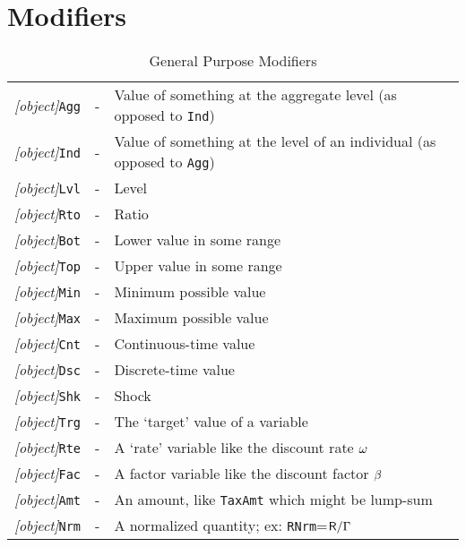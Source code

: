 \documentclass[12pt]{econtex}
\begin{document}
\section{Modifiers}
\begin{table}[ht]
	\centering
	\begin{tabular}{|>{\ttfamily}ccl|} 		
		\hline
   \textit{[object]}\texttt{Agg} & - & Value of something at the aggregate level (as opposed to \texttt{Ind})
\\ \textit{[object]}\texttt{Ind} & - & Value of something at the level of an individual (as opposed to \texttt{Agg})
\\ \textit{[object]}\texttt{Lvl} & - & Level 
\\ \textit{[object]}\texttt{Rto} & - & Ratio 
\\ \textit{[object]}\texttt{Bot} & - & Lower value in some range 
\\ \textit{[object]}\texttt{Top} & - & Upper value in some range 
\\ \textit{[object]}\texttt{Min} & - & Minimum possible value 
\\ \textit{[object]}\texttt{Max} & - & Maximum possible value 
\\ \textit{[object]}\texttt{Cnt} & - & Continuous-time value
\\ \textit{[object]}\texttt{Dsc} & - & Discrete-time value
\\ \textit{[object]}\texttt{Shk} & - & Shock 
\\ \textit{[object]}\texttt{Trg} & - & The `target' value of a variable 
\\ \textit{[object]}\texttt{Rte} & - & A `rate' variable like the discount rate $\omega$
\\ \textit{[object]}\texttt{Fac} & - & A factor variable like the discount factor $\beta$
\\ \textit{[object]}\texttt{Amt} & - & An amount, like \texttt{TaxAmt} which might be lump-sum
\\ \textit{[object]}\texttt{Nrm} & - & A normalized quantity; ex: \texttt{RNrm}=$\mathsf{R}/\Gamma$
\\ 	\hline
	\end{tabular}
	\caption{General Purpose Modifiers}
	\label{table:General}
\end{table}	

\medskip\medskip
\end{document}
